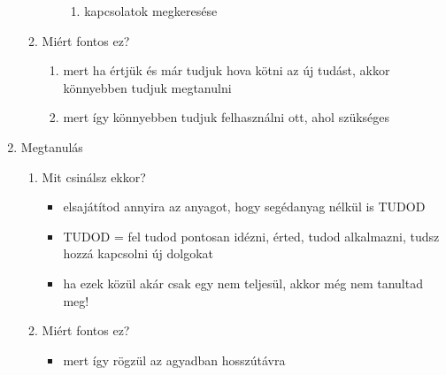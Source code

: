 \documentclass[../Main.tex]{subfiles}
\begin{document}
\begin{enumerate}
\begin{enumerate}
\begin{enumerate}
\begin{enumerate}
			    \item kapcsolatok megkeresése
            \end{enumerate}
        \end{enumerate}
        \item Miért fontos ez?
        \begin{enumerate}
            \item mert ha értjük és már tudjuk hova kötni az új tudást, akkor könnyebben tudjuk megtanulni
			\item mert így könnyebben tudjuk felhasználni ott, ahol szükséges
        \end{enumerate}
    \end{enumerate}

    \item Megtanulás
    \begin{enumerate}
        \item Mit csinálsz ekkor?
        \begin{itemize}
            \item elsajátítod annyira az anyagot, hogy segédanyag nélkül is TUDOD
		    \item TUDOD = fel tudod pontosan idézni, érted, tudod alkalmazni, tudsz hozzá kapcsolni új dolgokat
		    \item ha ezek közül akár csak egy nem teljesül, akkor még nem tanultad meg!
        \end{itemize}
        \item Miért fontos ez?
        \begin{itemize}
            \item mert így rögzül az agyadban hosszútávra
        \end{itemize}
    \end{enumerate}


\end{enumerate}
\end{document}
